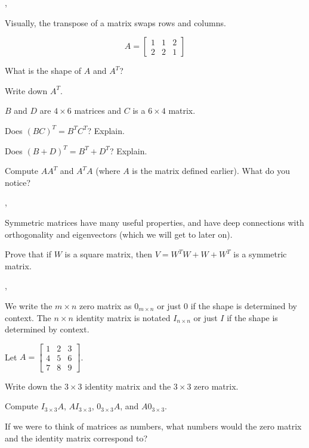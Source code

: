 \documentclass[letter]{article}
\newcommand{\mat}[1]{\begin{bmatrix}#1\end{bmatrix}}
\renewcommand{\emph}[1]{{\color{defcolor} \textbf{\textit{##1}}}}
\begin{document}
	\sep
	Visually, the transpose of a matrix swaps rows and columns.

	\[
		A=\mat{1&1&2\\2&2&1}
	\]
	\begin{Enum}
		\item What is the shape of $A$ and $A^T$?
		\item Write down $A^T$.
	\end{Enum}

	$B$ and $D$ are $4\times 6$ matrices and $C$ is a $6\times 4$ matrix.

	\begin{Enum}[resume]
		\item Does $(BC)^T=B^TC^T$? Explain.
		\item Does $(B+D)^T=B^T+D^T$? Explain.
		\item Compute $AA^T$ and $A^TA$ (where $A$ is the matrix defined earlier).
		What do you notice?
	\end{Enum}

	\sep
	Symmetric matrices have many useful properties,
	and have deep connections with orthogonality and eigenvectors (which we will get to later on).

	\begin{Enum}
		\item Prove that if $W$ is a square matrix, then $V=W^TW+W+W^T$ is a symmetric
		matrix.
	\end{Enum}

	\sep
	We write the $m\times n$ zero matrix as $0_{m\times n}$ or just $0$ if the shape
	is determined by context.  The $n\times n$ identity matrix is notated $I_{n\times n}$ or just
	$I$ if the shape is determined by context.

	Let $A=\mat{1&2&3\\4&5&6\\7&8&9}$.
	\begin{Enum}
		\item Write down the $3\times 3$ identity matrix and the $3\times 3$ zero
		matrix.
		\item Compute $I_{3\times 3}A$, $AI_{3\times 3}$, $0_{3\times 3}A$,
		and $A0_{3\times 3}$.
		\item If we were to think of matrices as numbers, what numbers would the
		zero matrix and the identity matrix correspond to?
	\end{Enum}
\end{document}
